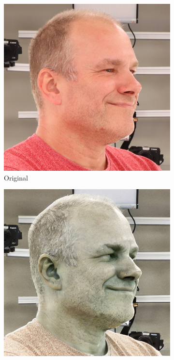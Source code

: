 \begin{figure}[ht]
    \centering
    \begin{subfigure}{0.18\linewidth}
        \includegraphics[width=\textwidth]{Figures/resized_images/0-4-5-1-5648_230239_266.JPG}
		\caption{Original}
	\end{subfigure}
    \begin{subfigure}{0.18\linewidth}
        \includegraphics[width=\textwidth]{Figures/naive/default/ipix2pix_sven_stone/0-4-5-1-5648_230239_266.png}

\end{subfigure}
\end{figure}

